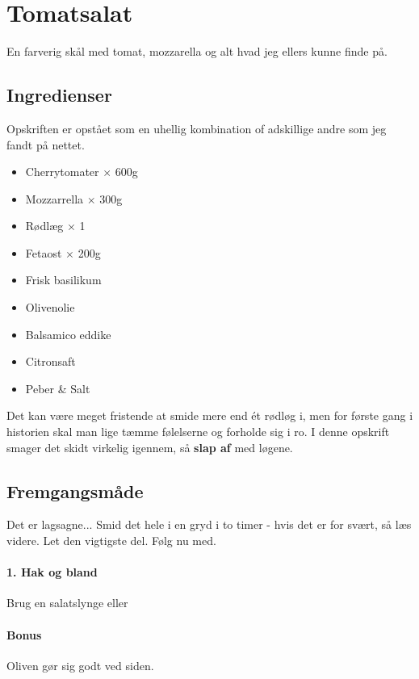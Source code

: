 \section{Tomatsalat}
En farverig skål med tomat, mozzarella og alt hvad jeg ellers kunne finde på.

\subsection{Ingredienser}
Opskriften er opstået som en uhellig kombination of adskillige andre som jeg fandt på nettet. 

\begin{multicols}{2	}
	\begin{itemize}
		\item Cherrytomater $\times$ 600g
		\item Mozzarrella $\times$ 300g
		\item Rødlæg $\times$ 1
		\item Fetaost $\times$ 200g
		\item Frisk basilikum
		\item Olivenolie
		\item Balsamico eddike
		\item Citronsaft		
		\item Peber \& Salt
	\end{itemize}
\end{multicols}

Det kan være meget fristende at smide mere end ét rødløg i, men for første gang i historien skal man lige tæmme følelserne og forholde sig i ro. I denne opskrift smager det skidt virkelig igennem, så \textbf{slap af} med løgene.

\subsection{Fremgangsmåde}
Det er lagsagne... Smid det hele i en gryd i to timer - hvis det er for svært, så læs videre. Let den vigtigste del. Følg nu med.


\paragraph*{1. Hak og bland}
Brug en salatslynge eller 

\paragraph*{Bonus} Oliven gør sig godt ved siden.